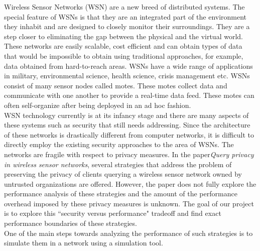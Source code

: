 \documentclass[11pt, titlepage, oneside]{article}
\begin{document}
Wireless Sensor Networks (WSN) are a new breed of distributed systems. The special feature of WSNs is that they are an integrated part of the environment they inhabit and are designed to closely monitor their surroundings. They are a step closer to eliminating the gap between the physical and the virtual world. These networks are easily scalable, cost efficient and can obtain types of data that would be impossible to obtain using traditional approaches, for example, data obtained from hard-to-reach areas. WSNs have a wide range of applications in military, environmental science, health science, crisis management etc. WSNs consist of many sensor nodes called motes. These motes collect data and communicate with one another to provide a real-time data feed. These motes can often self-organize after being deployed in an ad hoc fashion\cite{wsn1}. \\ 
WSN technology currently is at its infancy stage and there are many aspects of these systems such as security that still needs addressing. Since the architecture of these networks is drastically different from computer networks, it is difficult to directly employ the existing security approaches to the area of WSNs. The networks are fragile with respect to privacy measures. In the paper{\it Query privacy in wireless sensor networks}\cite{mainppr}, several strategies that address the problem of preserving the privacy of clients querying a wireless sensor network owned by untrusted organizations are offered. However, the paper does not fully explore the performance analysis of these strategies and the amount of the performance overhead imposed by these privacy measures is unknown. The goal of our project is to explore this ``security versus performance" tradeoff and find exact performance boundaries of these strategies.\\ 
One of the main steps towards analyzing the performance of such strategies is to simulate them in a network using a simulation tool.
 
 
\end{document}
